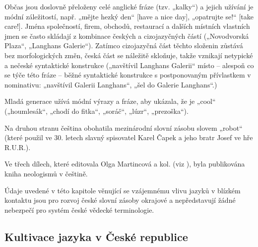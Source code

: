 \begin{multicols}{2}
Občas jsou doslovně přeloženy celé anglické fráze (tzv. „kalky“) a jejich užívání je módní záležitostí, např. „mějte hezký den“ {[}have a nice day{]}, „opatrujte se!“ {[}take care!{]}. Jména společností, firem, obchodů, restaurací a dalších místních vlastních jmen se často skládají z kombinace českých a cizojazyčných částí („Novodvorská Plaza“, „Langhans Galerie“). Zatímco cizojazyčná část těchto složenin zůstává bez morfologických změn, česká část se náležitě skloňuje, takže vznikají netypické a nečeské syntaktické konstrukce („navštívil Langhans Galerii“ místo – alespoň co se týče této fráze – běžné syntaktické konstrukce s postponovaným přívlastkem v nominativu: „navštívil Galerii Langhans“, „šel do Galerie Langhans“.)

Mladá generace užívá módní výrazy a fráze, aby ukázala, že je „cool“ („houmlesák“, „chodí do fitka“, „soráč“, „lúzr“, „prezoška“).

Na druhou stranu čeština obohatila mezinárodní slovní zásobu slovem „robot“ (které použil ve 30. letech slavný spisovatel Karel Čapek a jeho bratr Josef ve hře R.U.R.).

Ve třech dílech, které editovala Olga Martincová a kol. (viz \cite{Martincova_cs}), byla publikována kniha neologismů v češtině.

Údaje uvedené v této kapitole věnující se vzájemnému vlivu jazyků v blízkém kontaktu jsou pro rozvoj české slovní zásoby okrajové a nepředstavují žádné nebezpečí pro systém české vědecké terminologie.
  
\subsection{Kultivace jazyka v České republice}


\end{multicols}
